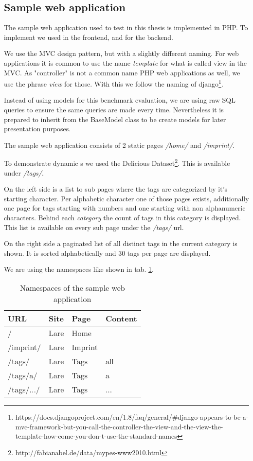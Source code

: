 \subsection{Sample web application}

The sample web application used to test \lare{} in this thesis is implemented in PHP.
To implement \lare{} we used \lareJS{} in the frontend, \twigLare{} and \phpLare{} for the backend.

We use the MVC design pattern, but with a slightly different naming.
For web applications it is common to use the name \emph{template} for what is called view in the MVC.
As "controller" is not a common name PHP web applications as well, we use the phrase \emph{view} for those.
With this we follow the naming of django\footnote{https://docs.djangoproject.com/en/1.8/faq/general/\#django-appears-to-be-a-mvc-framework-but-you-call-the-controller-the-view-and-the-view-the-template-how-come-you-don-t-use-the-standard-names}.

Instead of using models for this benchmark evaluation, we are using raw SQL queries to ensure the same queries are made every time.
Nevertheless it is prepared to inherit from the BaseModel class to be create models for later presentation purposes.

The sample web application consists of 2 static pages \emph{/home/} and \emph{/imprint/}.

To demonstrate dynamic \WebPage{}s we used the Delicious Dataset\footnote{http://fabianabel.de/data/mypes-www2010.html}.
This is available under \emph{/tags/}.

On the left side is a list to sub pages where the tags are categorized by it's starting character.
Per alphabetic character one of those pages exists, additionally one page for tags starting with numbers and one starting with non alphanumeric characters.
Behind each \emph{category} the count of tags in this category is displayed.
This list is available on every sub page under the \emph{/tags/} url.

On the right side a paginated list of all distinct tags in the current category is shown.
It is sorted alphabetically and 30 tags per page are displayed.

We are using the namespaces like shown in tab. \ref{tab:sampleapp_namespaces}.

\begin{table}[h]
\centering
\begin{tabular}{llll}
	\hline
	\textbf{URL} & \textbf{Site} & \textbf{Page} & \textbf{Content} \\
	\hline
	/ & Lare & Home &  \\
	/imprint/ & Lare & Imprint &  \\
	/tags/ & Lare & Tags & all \\
	/tags/a/ & Lare & Tags & a \\
	/tags/.../ & Lare & Tags & ... \\
	\hline
\end{tabular}
\caption{Namespaces of the sample web application}
\label{tab:sampleapp_namespaces}
\end{table}


